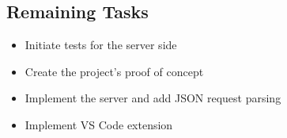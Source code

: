 \documentclass[10pt]{article}
\begin{document}
\begin{singlespace}
\section{Remaining Tasks}
\begin{itemize}
	\item Initiate tests for the server side
	\item Create the project's proof of concept
	\item Implement the server and add JSON request parsing
	\item Implement VS Code extension
\end{itemize}

\end{singlespace}
\end{document}
